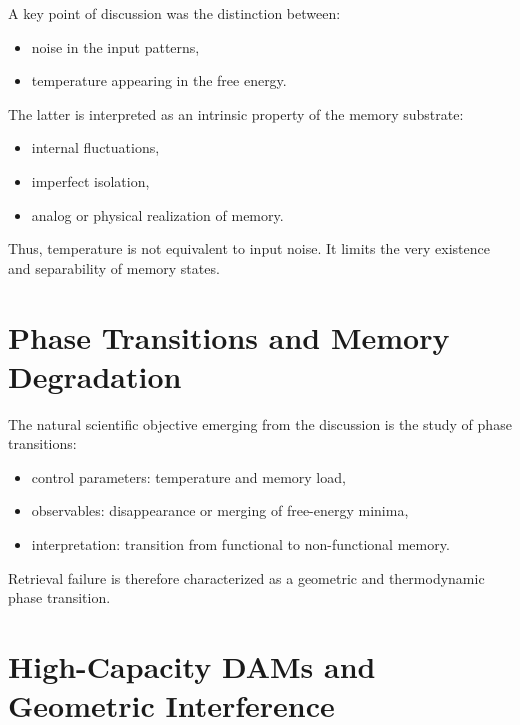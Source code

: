 \documentclass[11pt,a4paper]{article}
\begin{document}
A key point of discussion was the distinction between:

\begin{itemize}
    \item noise in the input patterns,
    \item temperature appearing in the free energy.
\end{itemize}

The latter is interpreted as an intrinsic property of the memory substrate:
\begin{itemize}
    \item internal fluctuations,
    \item imperfect isolation,
    \item analog or physical realization of memory.
\end{itemize}

Thus, temperature is not equivalent to input noise. It limits the very existence and separability of memory states.

\section{Phase Transitions and Memory Degradation}

The natural scientific objective emerging from the discussion is the study of phase transitions:

\begin{itemize}
    \item control parameters: temperature and memory load,
    \item observables: disappearance or merging of free-energy minima,
    \item interpretation: transition from functional to non-functional memory.
\end{itemize}

Retrieval failure is therefore characterized as a geometric and thermodynamic phase transition.

\section{High-Capacity DAMs and Geometric Interference}
\end{document}
